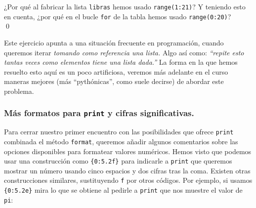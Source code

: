 \documentclass[10pt,a4paper]{article}\usepackage[]{graphicx}\usepackage[]{color}
\begin{document}
\begin{ejercicio}
\label{tut02:ejercicio17}
\quad
¿Por qué al fabricar la lista {\tt libras} hemos usado {\tt range(1:21)}? Y teniendo esto en cuenta, ¿por qué en el bucle {\tt for} de la tabla hemos usado {\tt range(0:20)}?\quad\\
\qed
\end{ejercicio}
Este ejercicio apunta a una situación frecuente en programación, cuando queremos iterar {\em tomando como referencia una lista.} Algo así como: {\em ``repite esto tantas veces como elementos tiene una lista dada.''} La forma en la que hemos resuelto esto aquí es un poco artificiosa, veremos más adelante en el curso maneras mejores (más ``pythónicas'', como suele decirse) de abordar este problema.

\subsubsection*{Más formatos para {\tt print} y cifras significativas.}
\label{tut02:subsubsec:MasFormatosPrintCifrasSignificativas}

Para cerrar nuestro primer encuentro con las posibilidades que ofrece {\tt print} combinada el método {\tt format}, queremos añadir algunos comentarios sobre las opciones disponibles
para formatear valores numéricos. Hemos visto que podemos usar una construcción como {\tt\{0:5.2f\}} para indicarle a {\tt print} que queremos mostrar un número usando cinco espacios y dos cifras tras la coma. Existen otras construcciones similares, sustituyendo {\tt f} por otros códigos. Por ejemplo, si usamos {\tt\{0:5.2e\}} mira lo que se obtiene al pedirle a {\tt print} que nos muestre el valor de {\tt pi}:
\end{document}
